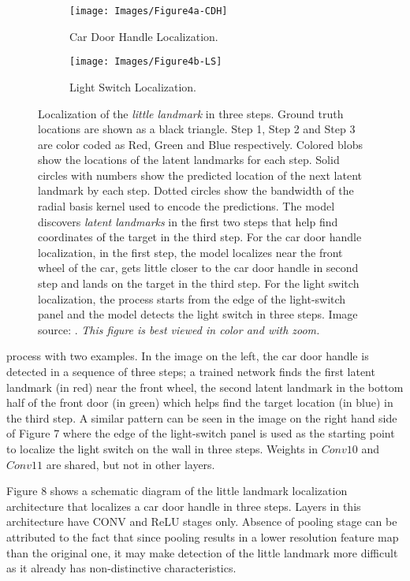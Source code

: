 \documentclass [11pt,letterpaper ,twoside ,openany ]{report}
\begin{document}
    \begin{figure}[h!]
    \centering
        \begin{subfigure}[b]{0.45\linewidth}
            \texttt{[image: Images/Figure4a-CDH]}
            \caption{Car Door Handle Localization.}
        \end{subfigure}
        \begin{subfigure}[b]{0.45\linewidth}
            \texttt{[image: Images/Figure4b-LS]}
            \caption{Light Switch Localization.}
        \end{subfigure}
        \caption{Localization of the \textit{little landmark} in three steps. Ground truth locations are shown as a black triangle. Step 1, Step 2 and Step 3 are color coded as Red, Green and Blue respectively. Colored blobs show the locations of the latent landmarks for each step. Solid circles with numbers show the predicted location of the next latent landmark by each step. Dotted circles show the bandwidth of the radial basis kernel used to encode the predictions. The model discovers \textit{latent landmarks} in the first two steps that help find coordinates of the target in the third step. For the car door handle localization, in the first step, the model localizes near the front wheel of the car, gets little closer to the car door handle in second step and lands on the target in the third step. For the light switch localization, the process starts from the edge of the light-switch panel and the model detects the light switch in three steps. Image source: \cite{Singh_2016_CVPR}. \textit{This figure is best viewed in color and with zoom.}}
        \label{fig:localization}
    \end{figure}

    \noindent
    process with two examples. In the image on the left, the car door handle is detected in a sequence of three steps; a trained network finds the first latent landmark (in red) near the front wheel, the second latent landmark in the bottom half of the front door (in green) which helps find the target location (in blue) in the third step. A similar pattern can be seen in the image on the right hand side of Figure 7 where the edge of the light-switch panel is used as the starting point to localize the light switch on the wall in three steps. Weights in \(Conv10\) and \(Conv11\) are shared, but not in other layers. 

    Figure 8 shows a schematic diagram of the little landmark localization architecture that localizes a car door handle in three steps. Layers in this architecture have CONV and ReLU stages only. Absence of pooling stage can be attributed to the fact that since pooling results in a lower resolution feature map than the original one, it may make detection of the little landmark more difficult as it already has non-distinctive characteristics. 
\end{document}
